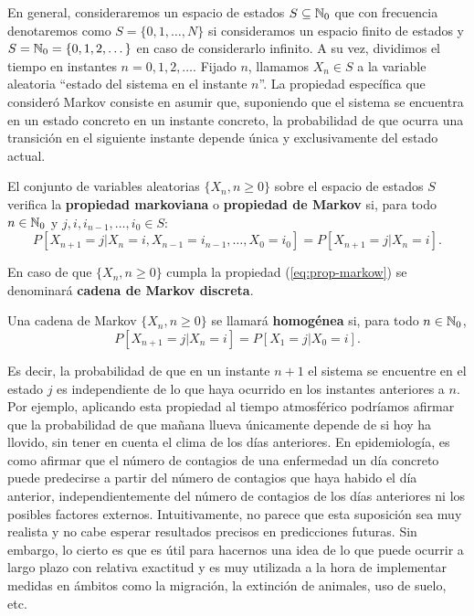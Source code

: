 En general, consideraremos un espacio de estados $S\subseteq \mathbb{N}_0$ que con frecuencia denotaremos como $S=\{0,1,\dots,N\}$ si consideramos un espacio finito de estados y $S=\mathbb{N}_0=\{0,1,2,\dots\}$ en caso de considerarlo infinito. A su vez, dividimos el tiempo en instantes $n=0,1,2,\dots$. Fijado $n$, llamamos $X_n\in S$ a la variable aleatoria ``estado del sistema en el instante $n$''. La propiedad específica que consideró Markov consiste en asumir que, suponiendo que el sistema se encuentra en un estado concreto en un instante concreto, la probabilidad de que ocurra una transición en el siguiente instante depende única y exclusivamente del estado actual.

\begin{definicion}
    El conjunto de variables aleatorias $\{X_n,n\geq 0\}$ sobre el espacio de estados $S$ verifica la \textbf{propiedad markoviana} o \textbf{propiedad de Markov} si, para todo $n\in\mathbb{N}_0$ y $j,i,i_{n-1},\dots, i_0 \in S$:
    \begin{equation}
        \label{eq:prop-markow}
        P[X_{n+1}=j | X_n=i, X_{n-1}=i_{n-1}, \dots, X_0=i_0 ] = P[X_{n+1}=j | X_n=i].
    \end{equation}

    En caso de que $\{X_n,n\geq 0\}$ cumpla la propiedad (\ref{eq:prop-markow}) se denominará \textbf{cadena de Markov discreta}.

    Una cadena de Markov $\{X_n, n\geq 0\}$ se llamará \textbf{homogénea} si, para todo $n\in\mathbb{N}_0$,
    \begin{equation}
        \label{eq:cad-homogenea}
        P[X_{n+1}=j|X_n=i] = P[X_1=j|X_0=i].
    \end{equation}
\end{definicion}

Es decir, la probabilidad de que en un instante $n+1$ el sistema se encuentre en el estado $j$ es independiente de lo que haya ocurrido en los instantes anteriores a $n$. Por ejemplo, aplicando esta propiedad al tiempo atmosférico podríamos afirmar que la probabilidad de que mañana llueva únicamente depende de si hoy ha llovido, sin tener en cuenta el clima de los días anteriores. En epidemiología, es como afirmar que el número de contagios de una enfermedad un día concreto puede predecirse a partir del número de contagios que haya habido el día anterior, independientemente del número de contagios de los días anteriores ni los posibles factores externos. Intuitivamente, no parece que esta suposición sea muy realista y no cabe esperar resultados precisos en predicciones futuras. Sin embargo, lo cierto es que es útil para hacernos una idea de lo que puede ocurrir a largo plazo con relativa exactitud y es muy utilizada a la hora de implementar medidas en ámbitos como la migración, la extinción de animales, uso de suelo, etc.

